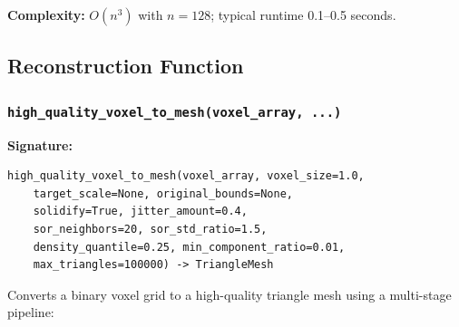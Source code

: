 \documentclass[12pt,a4paper]{article}
\begin{document}
\textbf{Complexity:} $O(n^3)$ with $n = 128$; typical runtime 0.1--0.5 seconds.

\subsection{Reconstruction Function}

\subsubsection{\texttt{high\_quality\_voxel\_to\_mesh(voxel\_array, ...)}}

\textbf{Signature:}
\begin{lstlisting}
high_quality_voxel_to_mesh(voxel_array, voxel_size=1.0,
    target_scale=None, original_bounds=None,
    solidify=True, jitter_amount=0.4,
    sor_neighbors=20, sor_std_ratio=1.5,
    density_quantile=0.25, min_component_ratio=0.01,
    max_triangles=100000) -> TriangleMesh
\end{lstlisting}

Converts a binary voxel grid to a high-quality triangle mesh using a multi-stage pipeline:
\end{document}
